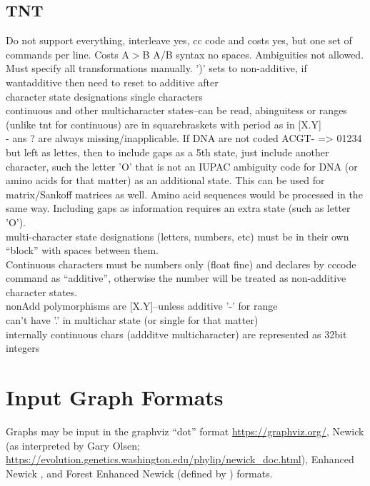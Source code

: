 \documentclass[11pt]{memoir}
\begin{document}
		\subsection{TNT}
		Do not support everything, interleave yes, cc code and costs yes, but one set of commands per line.
		Costs A$>$B A$/$B syntax no spaces. Ambiguities not allowed.  Must specify all transformations manually.
		')' sets to non-additive, if wantadditive then need to reset to additive after\\
		character state designations single characters\\
		continuous and other multicharacter states--can be read, abinguitess or ranges (unlike tnt for continuous) are 
		in squarebraskets with period as in [X.Y]\\
		- ans ? are always missing/inapplicable.  If DNA are not coded ACGT- => 01234 but left as lettes,
		then to include gaps as a 5th state, just include another character, such the letter 'O' that is not an IUPAC ambiguity code for DNA (or amino acids for that matter) as an additional state.  This can be used for matrix/Sankoff matrices as well.
		Amino acid sequences would be processed in the same way.  Including gaps as information requires
		an extra state (such as letter 'O').\\ 
		multi-character state designations (letters, numbers, etc) must be in their own ``block'' with spaces 
		between them.\\
		Continuous characters must be numbers only (float fine) and declares by cccode command as 
		``additive'', otherwise the number will be treated as non-additive character states. \\
		nonAdd polymorphisms  are [X.Y]--unless  additive '-' for range\\
		can't have '.' in multichar state (or single for that matter)\\
		internally continuous chars (addditve multicharacter) are represented as 32bit integers
	
	\section{Input Graph Formats}
	Graphs may be input in the graphviz ``dot'' format \url{https://graphviz.org/}, Newick (as interpreted by Gary Olsen; \url{https://evolution.genetics.washington.edu/phylip/newick_doc.html}), Enhanced Newick \cite{Cardonaetal2008},
	and Forest Enhanced Newick (defined by \citealp{WheelerPhyloSuperGraphs}) formats.
	
\end{document}
